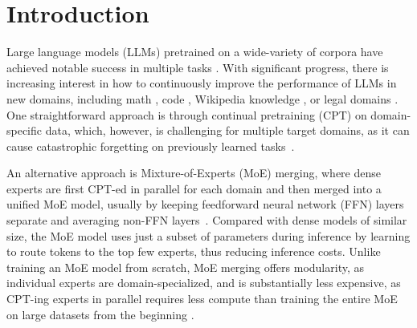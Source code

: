\section{Introduction}
\label{sec:intro}

Large language models (LLMs) pretrained on a wide-variety of corpora have achieved notable success in multiple tasks \cite{touvron2023llama, openai2023gpt4, brown2020language, liu2024large}. With significant progress, there is increasing interest in how to continuously improve the performance of LLMs in new domains, including math \cite{yu2023metamath}, code \cite{roziere2023code}, Wikipedia knowledge \cite{shao2024assisting}, or legal domains \cite{cui2023chatlaw}. One straightforward approach is through continual pretraining (CPT) on domain-specific data, which, however, is challenging for multiple target domains, as it can cause catastrophic forgetting on previously learned tasks~\citep{luo2023empirical}. 




An alternative approach is Mixture-of-Experts (MoE) merging, where dense experts are first CPT-ed in parallel for each domain and then merged into a unified MoE model, usually by keeping feedforward neural network (FFN) layers separate and averaging non-FFN layers~\cite{sukhbaatar2024branchtrainmixmixingexpertllms, kang2024self}.
Compared with dense models of similar size, the MoE model uses just a subset of parameters during inference by learning to route tokens to the top few experts, thus reducing inference costs.
Unlike training an MoE model from scratch, MoE merging offers modularity, as individual experts are domain-specialized, and is substantially less expensive, as CPT-ing experts in parallel requires less compute than training the entire MoE on large datasets from the beginning \cite{sukhbaatar2024branchtrainmixmixingexpertllms}.

